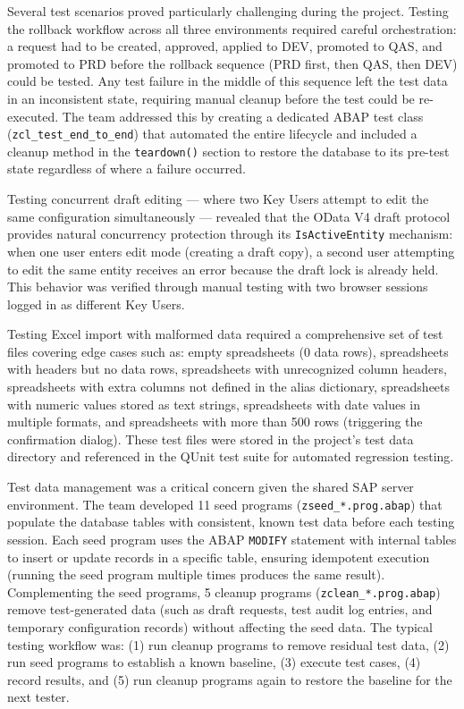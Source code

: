 \documentclass[12pt,a4paper]{report}
\begin{document}
Several test scenarios proved particularly challenging during the project. Testing the rollback workflow across all three environments required careful orchestration: a request had to be created, approved, applied to DEV, promoted to QAS, and promoted to PRD before the rollback sequence (PRD first, then QAS, then DEV) could be tested. Any test failure in the middle of this sequence left the test data in an inconsistent state, requiring manual cleanup before the test could be re-executed. The team addressed this by creating a dedicated ABAP test class (\texttt{zcl\_test\_end\_to\_end}) that automated the entire lifecycle and included a cleanup method in the \texttt{teardown()} section to restore the database to its pre-test state regardless of where a failure occurred.

Testing concurrent draft editing --- where two Key Users attempt to edit the same configuration simultaneously --- revealed that the OData V4 draft protocol provides natural concurrency protection through its \texttt{IsActiveEntity} mechanism: when one user enters edit mode (creating a draft copy), a second user attempting to edit the same entity receives an error because the draft lock is already held. This behavior was verified through manual testing with two browser sessions logged in as different Key Users.

Testing Excel import with malformed data required a comprehensive set of test files covering edge cases such as: empty spreadsheets (0 data rows), spreadsheets with headers but no data rows, spreadsheets with unrecognized column headers, spreadsheets with extra columns not defined in the alias dictionary, spreadsheets with numeric values stored as text strings, spreadsheets with date values in multiple formats, and spreadsheets with more than 500 rows (triggering the confirmation dialog). These test files were stored in the project's test data directory and referenced in the QUnit test suite for automated regression testing.

Test data management was a critical concern given the shared SAP server environment. The team developed 11 seed programs (\texttt{zseed\_*.prog.abap}) that populate the database tables with consistent, known test data before each testing session. Each seed program uses the ABAP \texttt{MODIFY} statement with internal tables to insert or update records in a specific table, ensuring idempotent execution (running the seed program multiple times produces the same result). Complementing the seed programs, 5 cleanup programs (\texttt{zclean\_*.prog.abap}) remove test-generated data (such as draft requests, test audit log entries, and temporary configuration records) without affecting the seed data. The typical testing workflow was: (1) run cleanup programs to remove residual test data, (2) run seed programs to establish a known baseline, (3) execute test cases, (4) record results, and (5) run cleanup programs again to restore the baseline for the next tester.
\end{document}
